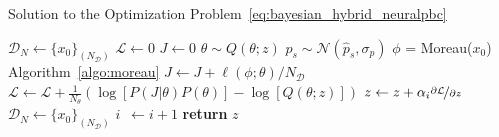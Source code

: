 \begin{algorithm}
    \caption{Solution to the Optimization Problem~\eqref{eq:bayesian_hybrid_neuralpbc}}
    \label{algo:bayes_neuralpbc}
    \small
    \begin{algorithmic}[1]
        \algrenewcommand\algorithmicindent{0em} %
        \State $\mathcal{D}_N \gets \{x_0\}_{(N_{\mathcal{D}})}$   
        \algrenewcommand\algorithmicindent{1.1em} %
        \State $\mathcal{L} \gets 0$ 
         
        \State $J \gets 0$ 
        \State $\theta \sim Q(\theta; z)$ 
            \State $p_s \sim \mathcal{N}(\hat{p}_s, \sigma_p)$
            \State $\phi$ = Moreau($x_0$) \Comment Algorithm~\eqref{algo:moreau}
            \State $J \gets J + \ell(\phi; \theta)/N_{\mathcal{D}}$ 
            \EndFor
        \State $\mathcal{L} \gets \mathcal{L} + \frac{1}{N_{\theta}} \left(\log[P(J | \theta) P(\theta)] - \log[Q(\theta;z)]\right)$
        \EndFor
        \State $z \gets z + \alpha_i \nicefrac{\partial \mathcal{L}}{\partial z}$
        \State $\mathcal{D}_N \gets \{x_0\}_{(N_{\mathcal{D}})}$
        \State $i \;\:\gets i + 1$
        \EndWhile
        \State \textbf{return} $z$
    \end{algorithmic}
\end{algorithm}
